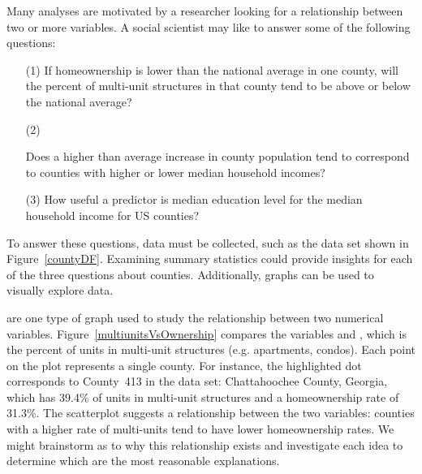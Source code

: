 Many analyses are motivated by a researcher looking
for a relationship between two or more variables.
A social scientist may like to answer some of the
following questions:
\newcommand{\popchangevmedianhhincomequestion}[0]{
    Does a higher than average increase in county population
    tend to correspond to counties with higher or lower median
    household incomes?}%
\begin{enumerate}
\setlength{\itemsep}{0mm}
\item[(1)]\label{ownershipMultiUnitQuestion}
    If homeownership is lower than the national average
    in one county, will the percent of multi-unit structures
    in that county tend to be above or below the national average?
\item[(2)]\label{pop_change_v_median_hh_income_question}
    \popchangevmedianhhincomequestion{}
\item[(3)]\label{isAverageIncomeAssociatedWithSmokingBans}
    How useful a predictor is median education level
    for the median household income for US counties?
\end{enumerate}

To answer these questions, data must be collected, such
as the  data set shown in Figure~\ref{countyDF}.
Examining summary statistics  could
provide insights for each of the three questions about counties.
Additionally, graphs can be used to visually explore data.

 are one type of graph
used to study the relationship between two numerical variables.
Figure~\ref{multiunitsVsOwnership} compares the variables
 and
,
which is the percent of units in multi-unit structures
(e.g. apartments, condos).
Each point on the plot represents a single county.
For instance, the highlighted dot corresponds to
County~413 in the  data set:
Chattahoochee County, Georgia, which has 39.4\% of
units in multi-unit structures and a homeownership rate
of 31.3\%.
The scatterplot suggests a relationship between the
two variables: counties with a higher rate of multi-units
tend to have lower homeownership rates.
We might brainstorm as to why this relationship exists
and investigate each idea to determine which are the most
reasonable explanations.

